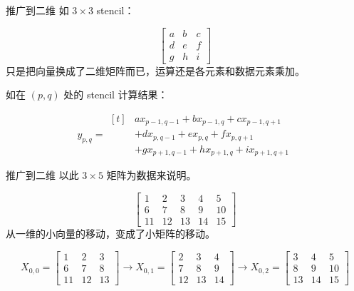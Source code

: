 \documentclass[aspectratio=169,10pt]{beamer}
\providecommand{\cross}{\times}
\begin{document}
\begin{frame}[fragile]{推广到二维}
如 $3\cross3$ stencil：
\par
\[
\begin{bmatrix}
a & b & c \\
d & e & f \\
g & h & i
\end{bmatrix}
\]
只是把向量换成了二维矩阵而已，运算还是各元素和数据元素乘加。
\par
如在 $(p,q)$ 处的 stencil 计算结果：
\par
\[
y_{p,q} = 
\begin{aligned}[t]
& a x_{p-1,q-1} + b x_{p-1,q} + c x_{p-1,q+1} \\
& + d x_{p,q-1} + e x_{p,q} + f x_{p,q+1} \\
& + g x_{p+1,q-1} + h x_{p+1,q} + i x_{p+1,q+1}
\end{aligned}
\]
\end{frame}

\begin{frame}[fragile]{推广到二维}
以此 $3\cross5$ 矩阵为数据来说明。
\par
\[
\begin{bmatrix}
1 & 2 & 3 & 4 & 5 \\
6 & 7 & 8 & 9 & 10 \\
11 & 12 & 13 & 14 & 15
\end{bmatrix}
\]
从一维的小向量的移动，变成了小矩阵的移动。
\par
\[
X_{0,0} = \begin{bmatrix}
1 & 2 & 3 \\
6 & 7 & 8 \\
11 & 12 & 13
\end{bmatrix}\to
X_{0,1} = \begin{bmatrix}
2 & 3 & 4 \\
7 & 8 & 9 \\
12 & 13 & 14
\end{bmatrix}\to
X_{0,2} = \begin{bmatrix}
3 & 4 & 5 \\
8 & 9 & 10 \\
13 & 14 & 15
\end{bmatrix}
\]
\end{frame}
\end{document}
